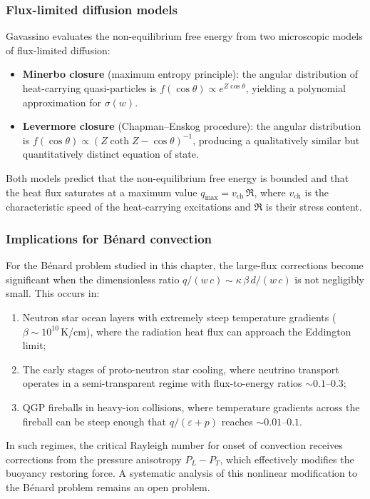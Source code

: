 \subsubsection{Flux-limited diffusion models}
Gavassino evaluates the non-equilibrium free energy from two
microscopic models of flux-limited diffusion:
\begin{itemize}
  \item \textbf{Minerbo closure} (maximum entropy principle): the
    angular distribution of heat-carrying quasi-particles is
    $f(\cos\theta) \propto e^{Z\cos\theta}$, yielding a polynomial
    approximation for $\sigma(w)$.
  \item \textbf{Levermore closure} (Chapman--Enskog procedure): the
    angular distribution is
    $f(\cos\theta) \propto (Z\coth Z - \cos\theta)^{-1}$, producing
    a qualitatively similar but quantitatively distinct equation of state.
\end{itemize}
Both models predict that the non-equilibrium free energy is bounded and
that the heat flux saturates at a maximum value $q_{\max} = v_{\mathrm{ch}}\,\mathfrak{R}$,
where $v_{\mathrm{ch}}$ is the characteristic speed of the heat-carrying
excitations and $\mathfrak{R}$ is their stress content.

\subsubsection{Implications for B\'enard convection}
For the B\'enard problem studied in this chapter, the large-flux
corrections become significant when the dimensionless ratio
$q/(w\,c) \sim \kappa\,\beta\,d/(w\,c)$ is not negligibly small.
This occurs in:
\begin{enumerate}
  \item[(i)] Neutron star ocean layers with extremely steep temperature
    gradients ($\beta \sim 10^{10}$\,K/cm), where the radiation heat
    flux can approach the Eddington limit;
  \item[(ii)] The early stages of proto-neutron star cooling, where
    neutrino transport operates in a semi-transparent regime with
    flux-to-energy ratios $\sim 0.1$--$0.3$;
  \item[(iii)] QGP fireballs in heavy-ion collisions, where temperature
    gradients across the fireball can be steep enough that $q/(\varepsilon + p)$
    reaches $\sim 0.01$--$0.1$.
\end{enumerate}
In such regimes, the critical Rayleigh number for onset of convection
receives corrections from the pressure anisotropy $P_L - P_T$, which
effectively modifies the buoyancy restoring force.  A systematic
analysis of this nonlinear modification to the B\'enard problem
remains an open problem.

